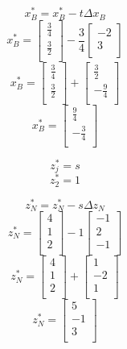 \documentclass[14pt]{extarticle}
\begin{document}
\[
    x^*_B = x^*_B - t \Delta x_B
\]
\[
    x^*_B = \begin{bmatrix}
        \frac{3}{4} \\
        \frac{3}{2} \\
    \end{bmatrix}
    - \frac{3}{4} \begin{bmatrix}
        -2 \\
        3 \\
    \end{bmatrix}
\]
\[
    x^*_B = \begin{bmatrix}
        \frac{3}{4} \\
        \frac{3}{2} \\
    \end{bmatrix}
    + \begin{bmatrix}
        \frac{3}{2} \\
        - \frac{9}{4} \\
    \end{bmatrix}
\]
\[
    x^*_B = \begin{bmatrix}
        \frac{9}{4} \\
        - \frac{3}{4} \\
    \end{bmatrix}
\]

\[
    z^*_j = s
\]
\[
    z^*_2 = 1
\]

\[
    z^*_N = z^*_N - s \Delta z_N
\]
\[
    z^*_N = \begin{bmatrix}
        4 \\
        1 \\
        2 \\
    \end{bmatrix}
    - 1 \begin{bmatrix}
        -1 \\
        2 \\
        -1 \\
    \end{bmatrix}
\]
\[
    z^*_N = \begin{bmatrix}
        4 \\
        1 \\
        2 \\
    \end{bmatrix}
    + \begin{bmatrix}
        1 \\
        -2 \\
        1 \\
    \end{bmatrix}
\]
\[
    z^*_N = \begin{bmatrix}
        5 \\
        -1 \\
        3 \\
    \end{bmatrix}
\]
\end{document}
